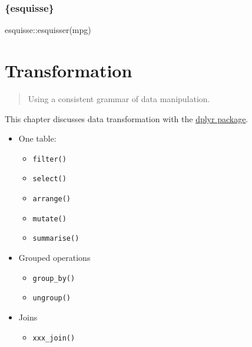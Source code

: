 \documentclass[]{book}
\newenvironment{Shaded}{}{}
\newcommand{\KeywordTok}[1]{\textcolor[rgb]{0.00,0.00,1.00}{#1}}
\newcommand{\NormalTok}[1]{#1}
\newcommand{\OperatorTok}[1]{#1}
\providecommand{\tightlist}{%
  \setlength{\itemsep}{0pt}\setlength{\parskip}{0pt}}
\begin{document}
\hypertarget{esquisse}{%
\subsection{\{esquisse\}}\label{esquisse}}

\begin{Shaded}
\begin{Highlighting}[]
\NormalTok{esquisse}\OperatorTok{::}\KeywordTok{esquisser}\NormalTok{(mpg)}
\end{Highlighting}
\end{Shaded}

\hypertarget{transformation}{%
\chapter{Transformation}\label{transformation}}

\begin{quote}
Using a consistent grammar of data manipulation.
\end{quote}

This chapter discusses data transformation with the \href{https://dplyr.tidyverse.org/}{dplyr package}.

\begin{itemize}
\tightlist
\item
  One table:

  \begin{itemize}
  \tightlist
  \item
    \texttt{filter()}
  \item
    \texttt{select()}
  \item
    \texttt{arrange()}
  \item
    \texttt{mutate()}
  \item
    \texttt{summarise()}
  \end{itemize}
\item
  Grouped operations

  \begin{itemize}
  \tightlist
  \item
    \texttt{group\_by()}
  \item
    \texttt{ungroup()}
  \end{itemize}
\item
  Joins

  \begin{itemize}
  \tightlist
  \item
    \texttt{xxx\_join()}
  \end{itemize}
\end{itemize}
\end{document}
